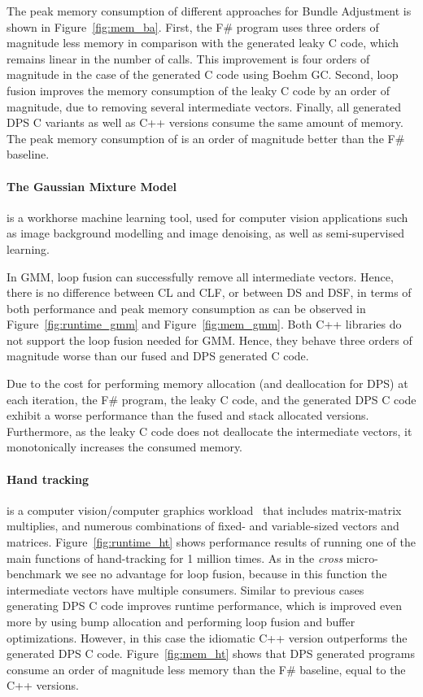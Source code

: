 The peak memory consumption of different approaches for Bundle Adjustment is shown in Figure~\ref{fig:mem_ba}. First, the F\# program uses three orders of magnitude less memory in comparison with the generated leaky C code, which remains linear in the number of calls. This improvement is four orders of magnitude in the case of the generated C code using
Boehm GC. Second, loop fusion improves the memory consumption of the leaky C code by an order of magnitude, due to removing several intermediate vectors. Finally, all generated DPS C variants as well as C++ versions consume the same amount of memory. The peak memory consumption of is an order of magnitude better than the F\# baseline. 

\paragraph{The Gaussian Mixture Model} is a workhorse machine learning tool, used for computer vision applications such as image background modelling and image denoising, as well as semi-supervised learning. 

In GMM, loop fusion can successfully remove all intermediate vectors. Hence, there is no difference between CL and CLF, or between DS and DSF, 
in terms of both performance and peak memory consumption as can be observed in Figure~\ref{fig:runtime_gmm} and Figure~\ref{fig:mem_gmm}. Both C++ libraries do not support the loop fusion needed for GMM. Hence, they behave three orders of magnitude worse than our fused and DPS generated C code.

Due to the cost for performing memory allocation (and deallocation for DPS) at each iteration, the F\# program, the leaky C code, and the generated DPS C code exhibit a worse performance than the fused and stack allocated versions. Furthermore, as the leaky C code does not deallocate the intermediate vectors, it monotonically increases the consumed memory.

\paragraph{Hand tracking} is a computer vision/computer graphics workload~\cite{taylor2014user} that includes matrix-matrix multiplies, and numerous combinations of fixed- and variable-sized vectors and matrices.
Figure~\ref{fig:runtime_ht} shows performance results of running one of the main functions of hand-tracking for 1 million times. As in the \emph{cross} micro-benchmark we see no advantage for loop fusion, because in this function the intermediate vectors have multiple consumers. Similar to previous cases generating DPS C code improves runtime performance, which is improved even more by using bump allocation and performing loop fusion and buffer optimizations. However, in this case the idiomatic C++ version outperforms the generated DPS C code. Figure~\ref{fig:mem_ht} shows that DPS generated programs consume an order of magnitude less memory than the F\# baseline, equal to the C++ versions.


